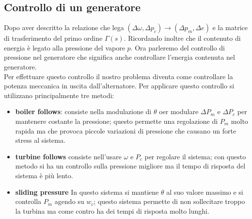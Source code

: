 \subsection{Controllo di un generatore}
Dopo aver descritto la relazione che lega $(\Delta\omega, \Delta p_c)\rightarrow(\Delta p_m, \Delta e)$ e la matrice di trasferimento del primo ordine $\Gamma (s)$. Ricordando inoltre che il contenuto di energia è legato alla pressione del vapore $p$.
Ora parleremo del controllo di pressione nel generatore che significa anche controllare l'energia contenuta nel generatore.\\
Per effettuare questo controllo il nostro problema diventa come controllare la potenza meccanica in uscita dall'alternatore. Per applicare questo controllo si utilizzano principalmente tre metodi:
\begin{itemize}
\item \textbf{boiler follows}: consiste nella modulazione di $\theta$ oer modulare $\Delta P_m$ e $\Delta P_c$ per mantenere costante la pressione; questo permette una regolazione di $P_m$ molto rapida ma che provoca piccole variazioni di pressione che causano un forte stress al sistema.
\item \textbf{turbine follows} consiste nell'usare $\omega$ e $P_c$ per regolare il sistema; con questo metodo si ha un controllo sulla pressione migliore ma il tempo di risposta del sistema è più lento.
\item \textbf{sliding pressure} In questo sistema si mantiene $\theta$ al suo valore massimo e si controlla $P_m$ agendo su $w_c$; questo sistema permette di non sollecitare troppo la turbina ma come contro ha dei tempi di risposta molto lunghi.

\end{itemize}

